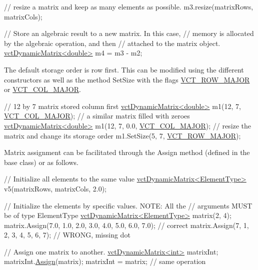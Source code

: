 \begin{DoxyEnumerate}
\begin{DoxyCode}
\textcolor{comment}{// resize a matrix and keep as many elements as possible.}
m3.resize(matrixRows, matrixCols);

\textcolor{comment}{// Store an algebraic result to a new matrix.  In this case,}
\textcolor{comment}{// memory is allocated by the algebraic operation, and then}
\textcolor{comment}{// attached to the matrix object.}
\hyperlink{classvct_dynamic_matrix}{vctDynamicMatrix<double>} m4 = m3 - m2;
\end{DoxyCode}
 
\item The default storage order is row first. This can be modified using the different constructors as well as the method Set\+Size with the flags \hyperlink{vct_forward_declarations_8h_a45ba752f741240bf765417ebc8130d62}{V\+C\+T\+\_\+\+R\+O\+W\+\_\+\+M\+A\+J\+O\+R} or \hyperlink{vct_forward_declarations_8h_a432cdf8923afaf82f551450ad4034746}{V\+C\+T\+\_\+\+C\+O\+L\+\_\+\+M\+A\+J\+O\+R}. 
\begin{DoxyCode}
\textcolor{comment}{// 12 by 7 matrix stored column first}
\hyperlink{classvct_dynamic_matrix}{vctDynamicMatrix<double>} m1(12, 7, \hyperlink{vct_forward_declarations_8h_a432cdf8923afaf82f551450ad4034746}{VCT\_COL\_MAJOR});
\textcolor{comment}{// a similar matrix filled with zeroes}
\hyperlink{classvct_dynamic_matrix}{vctDynamicMatrix<double>} m1(12, 7, 0.0, \hyperlink{vct_forward_declarations_8h_a432cdf8923afaf82f551450ad4034746}{VCT\_COL\_MAJOR});
\textcolor{comment}{// resize the matrix and change its storage order}
m1.SetSize(5, 7, \hyperlink{vct_forward_declarations_8h_a45ba752f741240bf765417ebc8130d62}{VCT\_ROW\_MAJOR});
\end{DoxyCode}
 
\item Matrix assignment can be facilitated through the Assign method (defined in the base class) or as follows. 
\begin{DoxyCode}
\textcolor{comment}{// Initialize all elements to the same value}
\hyperlink{classvct_dynamic_matrix}{vctDynamicMatrix<ElementType>} v5(matrixRows, matrixCols, 2.0);

\textcolor{comment}{// Initialize the elements by specific values.  NOTE: All the}
\textcolor{comment}{// arguments MUST be of type ElementType}
\hyperlink{classvct_dynamic_matrix}{vctDynamicMatrix<ElementType>} matrix(2, 4);
matrix.Assign(7.0, 1.0, 2.0, 3.0,
              4.0, 5.0, 6.0, 7.0); \textcolor{comment}{// correct}
matrix.Assign(7, 1, 2, 3,
              4, 5, 6, 7); \textcolor{comment}{// WRONG, missing dot}

\textcolor{comment}{// Assign one matrix to another.}
\hyperlink{classvct_dynamic_matrix}{vctDynamicMatrix<int>} matrixInt;
matrixInt.\hyperlink{classvct_dynamic_matrix_base_a2f080a67dc52e906f0219bbc924febbc}{Assign}(matrix);
matrixInt = matrix; \textcolor{comment}{// same operation}
\end{DoxyCode}
 
\end{DoxyEnumerate}

